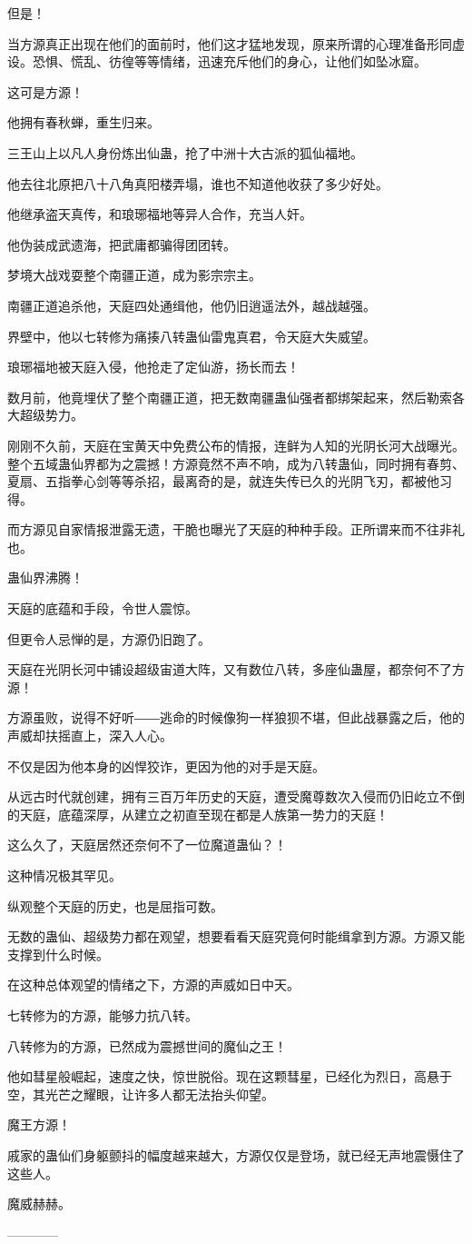 \begin{this_body}
但是！

当方源真正出现在他们的面前时，他们这才猛地发现，原来所谓的心理准备形同虚设。恐惧、慌乱、彷徨等等情绪，迅速充斥他们的身心，让他们如坠冰窟。

这可是方源！

他拥有春秋蝉，重生归来。

三王山上以凡人身份炼出仙蛊，抢了中洲十大古派的狐仙福地。

他去往北原把八十八角真阳楼弄塌，谁也不知道他收获了多少好处。

他继承盗天真传，和琅琊福地等异人合作，充当人奸。

他伪装成武遗海，把武庸都骗得团团转。

梦境大战戏耍整个南疆正道，成为影宗宗主。

南疆正道追杀他，天庭四处通缉他，他仍旧逍遥法外，越战越强。

界壁中，他以七转修为痛揍八转蛊仙雷鬼真君，令天庭大失威望。

琅琊福地被天庭入侵，他抢走了定仙游，扬长而去！

数月前，他竟埋伏了整个南疆正道，把无数南疆蛊仙强者都绑架起来，然后勒索各大超级势力。

刚刚不久前，天庭在宝黄天中免费公布的情报，连鲜为人知的光阴长河大战曝光。整个五域蛊仙界都为之震撼！方源竟然不声不响，成为八转蛊仙，同时拥有春剪、夏扇、五指拳心剑等等杀招，最离奇的是，就连失传已久的光阴飞刃，都被他习得。

而方源见自家情报泄露无遗，干脆也曝光了天庭的种种手段。正所谓来而不往非礼也。

蛊仙界沸腾！

天庭的底蕴和手段，令世人震惊。

但更令人忌惮的是，方源仍旧跑了。

天庭在光阴长河中铺设超级宙道大阵，又有数位八转，多座仙蛊屋，都奈何不了方源！

方源虽败，说得不好听――逃命的时候像狗一样狼狈不堪，但此战暴露之后，他的声威却扶摇直上，深入人心。

不仅是因为他本身的凶悍狡诈，更因为他的对手是天庭。

从远古时代就创建，拥有三百万年历史的天庭，遭受魔尊数次入侵而仍旧屹立不倒的天庭，底蕴深厚，从建立之初直至现在都是人族第一势力的天庭！

这么久了，天庭居然还奈何不了一位魔道蛊仙？！

这种情况极其罕见。

纵观整个天庭的历史，也是屈指可数。

无数的蛊仙、超级势力都在观望，想要看看天庭究竟何时能缉拿到方源。方源又能支撑到什么时候。

在这种总体观望的情绪之下，方源的声威如日中天。

七转修为的方源，能够力抗八转。

八转修为的方源，已然成为震撼世间的魔仙之王！

他如彗星般崛起，速度之快，惊世脱俗。现在这颗彗星，已经化为烈日，高悬于空，其光芒之耀眼，让许多人都无法抬头仰望。

魔王方源！

戚家的蛊仙们身躯颤抖的幅度越来越大，方源仅仅是登场，就已经无声地震慑住了这些人。

魔威赫赫。

------------

\end{this_body}

